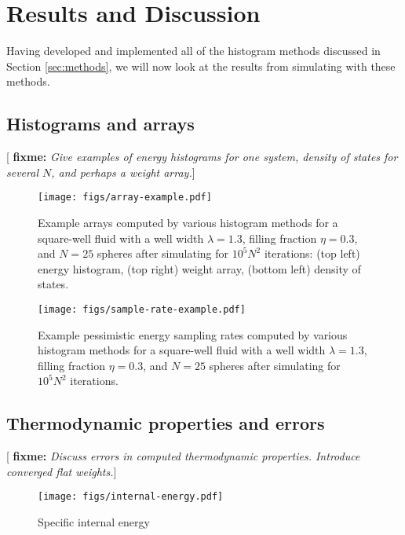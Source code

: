 \documentclass[11pt]{article}
\newcommand{\red}[1]{{\bf \color{red} #1}}
\newcommand{\fixme}[1]{[\red{fixme:} \emph{#1}]}
\begin{document}
\section{Results and Discussion}
\label{sec:results}

Having developed and implemented all of the histogram methods
discussed in Section \ref{sec:methods}, we will now look at the
results from simulating with these methods.

\subsection{Histograms and arrays}
\label{sec:histograms}



\fixme{Give examples of energy histograms for one system, density of
  states for several $N$, and perhaps a weight array.}

\begin{figure}[H]
  \centering
  \texttt{[image: figs/array-example.pdf]}
  \caption[Example arrays]
  {Example arrays computed by various histogram methods for a
    square-well fluid with a well width $\lambda=1.3$, filling
    fraction $\eta=0.3$, and $N=25$ spheres after simulating for
    $10^5N^2$ iterations: (top left) energy histogram, (top right)
    weight array, (bottom left) density of states.}
  \label{fig:arrays}
\end{figure}

\begin{figure}[H]
  \centering
  \texttt{[image: figs/sample-rate-example.pdf]}
  \caption[Example energy sampling rates]
  {Example pessimistic energy sampling rates computed by various
    histogram methods for a square-well fluid with a well width
    $\lambda=1.3$, filling fraction $\eta=0.3$, and $N=25$ spheres
    after simulating for $10^5N^2$ iterations.}
  \label{fig:sample_rates}
\end{figure}

\subsection{Thermodynamic properties and errors}
\label{sec:errors}

\fixme{Discuss errors in computed thermodynamic properties. Introduce
  converged flat weights.}

\begin{figure}[H]
  \centering
    \texttt{[image: figs/internal-energy.pdf]}
  \caption[Internal energy]
  {Specific internal energy}
  \label{fig:internal_energy}
\end{figure}
\end{document}
